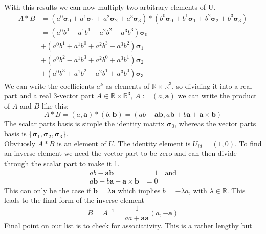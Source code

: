 \documentclass[11pt]{article}
\begin{document}
With this results we can now multiply two arbitrary elements of U.
\begin{equation}
    \begin{aligned}
        A * B &= (a^0\bm{\sigma}_0 + a^1\bm{\sigma}_1 + a^2\bm{\sigma}_2 + a^3\bm{\sigma}_3)
        * (b^0\bm{\sigma}_0 + b^1\bm{\sigma}_1 + b^2\bm{\sigma}_2 + b^3\bm{\sigma}_3) \\
        &=(a^0b^0 - a^1b^1 - a^2b^2 - a^3b^3)\bm{\sigma}_0 \\
        &+(a^0b^1 + a^1b^0 + a^2b^3 - a^3b^2)\bm{\sigma}_1 \\
        &+(a^0b^2 - a^1b^3 + a^2b^0 + a^3b^1)\bm{\sigma}_2 \\
        &+(a^0b^3 + a^1b^2 - a^2b^1 + a^3b^0)\mathbf{\bm{\sigma}}_3
    \end{aligned}
\end{equation}
We can write the coefficients $a^k$ as elements of $\mathbb{R} \times \mathbb{R}^3$,
so dividing it into a real part and a real 3-vector part 
$A \in \mathbb{R} \times \mathbb{R}^3, \, A := (a, \mathbf{a})$ we can write
the product of $A$ and $B$ like this:
\begin{equation}\label{eq:"QuatMult"}
    A*B=(a, \mathbf{a})*(b, \mathbf{b})
    =(ab-\mathbf{a}\mathbf{b}, a\mathbf{b}+b\mathbf{a}+\mathbf{a}\times\mathbf{b})
\end{equation}
The scalar parts basis is simple the identity matrix $\bm{\sigma}_0$, whereas the vector 
parts basis is \{$\bm{\sigma}_1, \bm{\sigma}_2, \bm{\sigma}_3$\}.\\
Obviuosly $A*B$ is an element of $U$. The identity element is $U_{id}=(1, 0)$. To find
an inverse element we need the vector part to be zero and can then divide through the
scalar part to make it 1.
\begin{subequations}
    \begin{align}
        ab-\mathbf{a}\mathbf{b} &= 1 \quad \text{and}\\
        a\mathbf{b}+b\mathbf{a}+\mathbf{a}\times\mathbf{b} &= 0
    \end{align}
\end{subequations}
This can only be the case if $\mathbf{b} = \lambda\mathbf{a}$ which implies 
$b=-\lambda a$, with $\lambda \in \mathbb{R}$.
This leads to the final form of the inverse element
\begin{equation}
    B = A^{-1} = \frac{1}{aa+\mathbf{a}\mathbf{a}}(a, -\mathbf{a})
\end{equation}
Final point on our list is to check for associativity. This is a rather lengthy but
\end{document}
